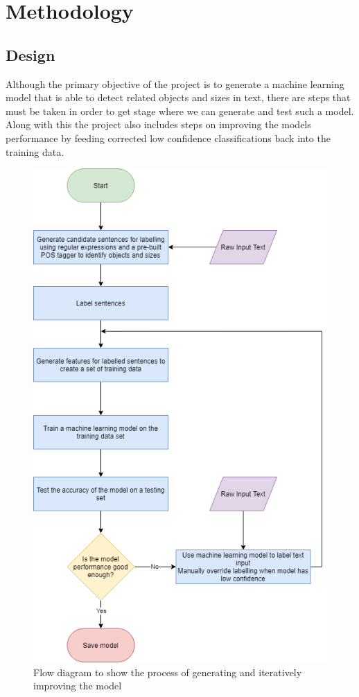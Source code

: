 \documentclass[11pt,oneside]{book}
\begin{document}
\chapter{Methodology}
\section{Design}
Although the primary objective of the project is to generate a machine learning model that is able to detect related objects and sizes in text, there are steps that must be taken in order to get stage where we can generate and test such a model. Along with this the project also includes steps on improving the models performance by feeding corrected low confidence classifications back into the training data.

\begin{figure}[!htbp]
\centering
\includegraphics[scale=0.35]{figures/ModelFlowDiagram.png}
\caption{Flow diagram to show the process of generating and iteratively improving the model}
\end{figure}
\end{document}
